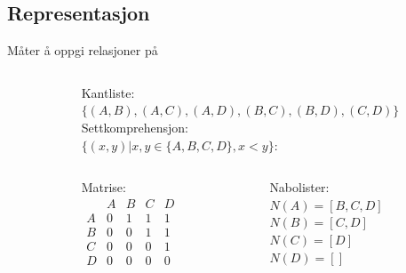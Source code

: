 \subsection*{Representasjon}
\begin{frame}[fragile]{Måter å oppgi relasjoner på}
    \begin{columns}
        \begin{column}{0.3\textwidth}
        \end{column}
        \begin{column}{0.65\textwidth}
            \pause
            Kantliste:\\
            $\{(A, B), (A, C), (A, D), (B, C), (B, D), (C, D)\}$\\[5mm]
            \pause
            Settkomprehensjon:\\
            $\{(x, y) | x, y \in \{A,B,C,D\}, x < y\}$:\\[5mm]
            \pause
            \begin{columns}
                \begin{column}{0.27\textwidth}
                    Matrise:\\
                    \begin{math}
                        \begin{matrix}
                              & A & B & C & D\\
                            A & 0 & 1 & 1 & 1\\
                            B & 0 & 0 & 1 & 1\\
                            C & 0 & 0 & 0 & 1\\
                            D & 0 & 0 & 0 & 0
                        \end{matrix}
                    \end{math}
                \end{column}
                \pause
                \begin{column}{0.38\textwidth}
                    Nabolister:\\        
                    $N(A) = [B, C, D]$\\
                    $N(B) = [C, D]$\\
                    $N(C) = [D]$\\
                    $N(D) = []$
                \end{column} 
            \end{columns}
        \end{column}
    \end{columns}
\end{frame}

